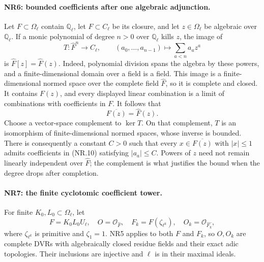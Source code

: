 \paragraph{NR6: bounded coefficients after one algebraic adjunction.}
Let $F\subset\Omega_\ell$ contain $\mathbb Q_\ell$, let
$\widehat F\subset C_\ell$ be its closure, and let $z\in\Omega_\ell$
be algebraic over $\mathbb Q_\ell$. If a monic polynomial of degree
$n>0$ over $\mathbb Q_\ell$ kills $z$, the image of
\[
 T:\widehat F^n\longrightarrow C_\ell,
       \qquad (a_0,\ldots,a_{n-1})\longmapsto
                         \sum_{a<n}a_a z^a             \tag{NR.10}
\]
is $\widehat F[z]=\widehat F(z)$. Indeed, polynomial division spans
the algebra by these powers, and a finite-dimensional domain over a
field is a field. This image is a finite-dimensional normed space
over the complete field $\widehat F$, so it is complete and closed.
It contains $F(z)$, and every displayed linear combination is a
limit of combinations with coefficients in $F$. It follows that
\[
                     \overline{F(z)}=\widehat F(z).
                                                               \tag{NR.11}
\]
Choose a vector-space complement to $\ker T$. On that complement,
$T$ is an isomorphism of finite-dimensional normed spaces, whose
inverse is bounded. There is consequently a constant $C>0$ such
that every $x\in\overline{F(z)}$ with $|x|\le1$ admits coefficients
in (NR.10) satisfying $|a_a|\le C$. Powers of $z$ need not remain
linearly independent over $\widehat F$; the complement is what
justifies the bound when the degree drops after completion.

\paragraph{NR7: the finite cyclotomic coefficient tower.}
For finite $K_0,L_0\subset\Omega_\ell$, let
\[
 F=K_0L_0U_\ell,\quad O=\mathcal O_{\widehat F},\quad
 F_k=F(\zeta_{\ell^k}),\quad O_k=\mathcal O_{\widehat{F_k}},
                                                               \tag{NR.12}
\]
where $\zeta_{\ell^k}$ is primitive and $\zeta_1=1$.
NR5 applies to both $F$ and $F_k$, so $O,O_k$ are complete DVRs
with algebraically closed residue fields and their exact adic
topologies. Their inclusions are injective and $\ell$ is in their
maximal ideals.

